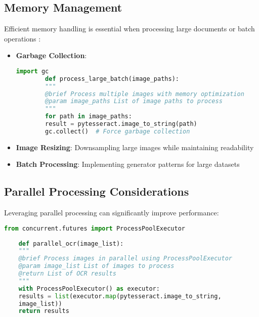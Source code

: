 \subsection{Memory Management}
Efficient memory handling is essential when processing large documents or batch operations :

\begin{itemize}
	\item \textbf{Garbage Collection}:
	\begin{lstlisting}[language=Python]
		import gc
		def process_large_batch(image_paths):
		"""
		@brief Process multiple images with memory optimization
		@param image_paths List of image paths to process
		"""
		for path in image_paths:
		result = pytesseract.image_to_string(path)
		gc.collect()  # Force garbage collection
	\end{lstlisting}
	
	\item \textbf{Image Resizing}: Downsampling large images while maintaining readability
	\item \textbf{Batch Processing}: Implementing generator patterns for large datasets
\end{itemize}

\subsection{Parallel Processing Considerations}
Leveraging parallel processing can significantly improve performance:

\begin{lstlisting}[language=Python]
	from concurrent.futures import ProcessPoolExecutor
	
	def parallel_ocr(image_list):
	"""
	@brief Process images in parallel using ProcessPoolExecutor
	@param image_list List of images to process
	@return List of OCR results
	"""
	with ProcessPoolExecutor() as executor:
	results = list(executor.map(pytesseract.image_to_string, 
	image_list))
	return results
\end{lstlisting}

